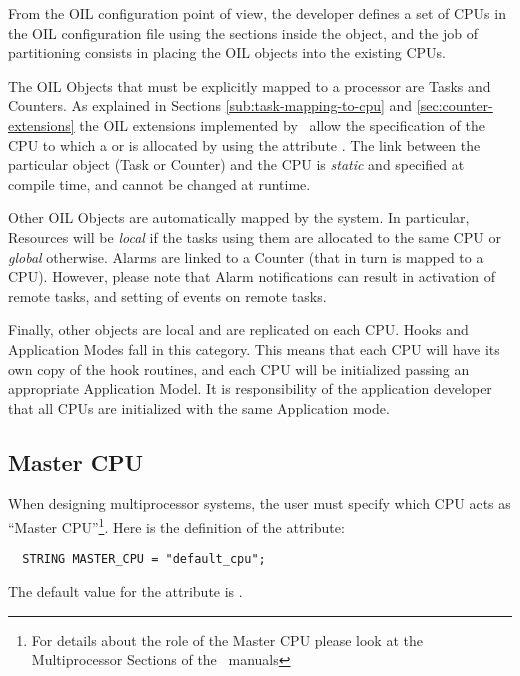 From the OIL configuration point of view, the developer defines a set
of CPUs in the OIL configuration file using the 
sections inside the  object, and the job of partitioning
consists in placing the OIL objects into the existing CPUs.

The OIL Objects that must be explicitly mapped to a processor are
Tasks and Counters. As explained in Sections
\ref{sub:task-mapping-to-cpu} and \ref{sec:counter-extensions} the OIL
extensions implemented by \rtd\ allow the specification of the CPU to
which a  or  is allocated by using the
attribute . The link between the particular object (Task
or Counter) and the CPU is {\em static} and specified at compile time,
and cannot be changed at runtime.

Other OIL Objects are automatically mapped by the system. In
particular, Resources will be {\em local} if the tasks using them are
allocated to the same CPU or {\em global} otherwise. Alarms are linked
to a Counter (that in turn is mapped to a CPU). However, please note
that Alarm notifications can result in activation of remote tasks, and
setting of events on remote tasks.

Finally, other objects are local and are replicated on each CPU. Hooks
and Application Modes fall in this category. This means that each CPU
will have its own copy of the hook routines, and each CPU will be
initialized passing an appropriate Application Model. It is
responsibility of the application developer that all CPUs are
initialized with the same Application mode.


\subsection{Master CPU}
\label{sub:master-cpu}
%
%

When designing multiprocessor systems, the user must specify which CPU
acts as ``Master CPU''\footnote{For details about the role of the Master CPU
please look at the Multiprocessor Sections of the \ee\ manuals}. Here
is the definition of the  attribute:

\begin{lstlisting}
  STRING MASTER_CPU = "default_cpu";
\end{lstlisting}

The default value for the  attribute is
. 

